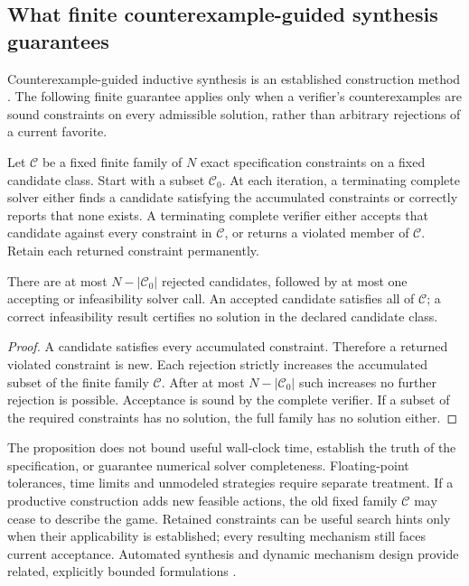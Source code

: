 \subsection{What finite counterexample-guided synthesis guarantees}\label{app:cegis}

Counterexample-guided inductive synthesis is an established construction method \cite{cegis}. The following finite guarantee applies only when a verifier's counterexamples are sound constraints on every admissible solution, rather than arbitrary rejections of a current favorite.

\begin{proposition}\label{prop:cegis}
Let $\mathcal C$ be a fixed finite family of $N$ exact specification constraints on a fixed candidate class. Start with a subset $\mathcal C_0$. At each iteration, a terminating complete solver either finds a candidate satisfying the accumulated constraints or correctly reports that none exists. A terminating complete verifier either accepts that candidate against every constraint in $\mathcal C$, or returns a violated member of $\mathcal C$. Retain each returned constraint permanently.

There are at most $N-|\mathcal C_0|$ rejected candidates, followed by at most one accepting or infeasibility solver call. An accepted candidate satisfies all of $\mathcal C$; a correct infeasibility result certifies no solution in the declared candidate class.
\end{proposition}

\begin{proof}
A candidate satisfies every accumulated constraint. Therefore a returned violated constraint is new. Each rejection strictly increases the accumulated subset of the finite family $\mathcal C$. After at most $N-|\mathcal C_0|$ such increases no further rejection is possible. Acceptance is sound by the complete verifier. If a subset of the required constraints has no solution, the full family has no solution either.
\end{proof}

The proposition does not bound useful wall-clock time, establish the truth of the specification, or guarantee numerical solver completeness. Floating-point tolerances, time limits and unmodeled strategies require separate treatment. If a productive construction adds new feasible actions, the old fixed family $\mathcal C$ may cease to describe the game. Retained constraints can be useful search hints only when their applicability is established; every resulting mechanism still faces current acceptance. Automated synthesis and dynamic mechanism design provide related, explicitly bounded formulations \cite{synthesis,dynamic}.

